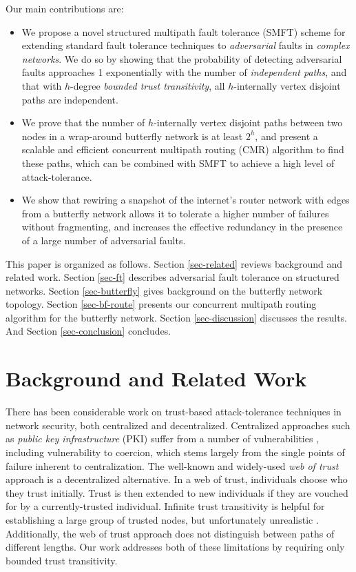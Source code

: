 \documentclass[10pt,letterpaper]{article}
\begin{document}
Our main contributions are:
\begin{itemize}
\item{
We propose a novel structured multipath fault tolerance (SMFT) scheme
for extending standard fault tolerance techniques to
{\em adversarial} faults in {\em complex networks}.
We do so by showing that the probability of detecting adversarial faults
approaches 1 exponentially with the number of {\em independent paths},
and that with $h$-degree {\em bounded trust transitivity},
all $h$-internally vertex disjoint paths are independent.
}
\item{We prove that the number of $h$-internally vertex disjoint
paths between two nodes in a wrap-around butterfly network
is at least $2^h$,
and present a scalable and efficient concurrent multipath routing (CMR) algorithm
to find these paths,
which can be combined with SMFT to achieve a high level of attack-tolerance.
}
\item{We show that rewiring a snapshot of the internet's router network with
edges from a butterfly network allows it to tolerate a higher number of failures
without fragmenting, and increases the effective redundancy in the presence
of a large number of adversarial faults.}
\end{itemize}

This paper is organized as follows.
Section \ref{sec-related} reviews background and related work.
Section \ref{sec-ft} describes adversarial fault tolerance on
structured networks.
Section \ref{sec-butterfly} gives background on the butterfly network topology.
Section \ref{sec-bf-route} presents our concurrent multipath routing
algorithm for the butterfly network.
Section \ref{sec-discussion} discusses the results.
And Section \ref{sec-conclusion} concludes.

\section*{Background and Related Work}
\label{sec-related}

There has been considerable work on trust-based attack-tolerance techniques
in network security, both centralized and decentralized.
Centralized approaches such as {\em public key infrastructure} (PKI)
suffer from a number of vulnerabilities
\cite{ellison_ten_2000}, including vulnerability to coercion,
which stems largely from the single points of failure inherent to
centralization.
The well-known and widely-used {\em web of trust} approach
\cite{zimmermann_official_1995,ferguson_practical_2003}
is a decentralized alternative.
In a web of trust,
individuals choose who they trust initially.
Trust is then extended to new individuals if they are vouched for by a
currently-trusted individual.
Infinite trust transitivity is helpful for establishing a large group of
trusted nodes, but unfortunately unrealistic
\cite{christianson_why_1997}.
Additionally, the web of trust approach
does not distinguish between paths of different lengths.
Our work addresses both of these limitations by requiring only
bounded trust transitivity.
\end{document}
